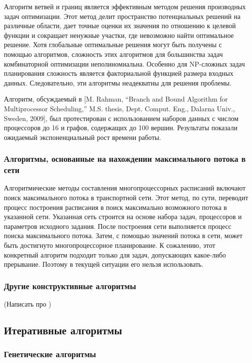 Алгоритм ветвей и границ является эффективным методом решения производных задач оптимизации. Этот метод делит пространство потенциальных решений на различные области, дает точные оценки их значения по отношению к целевой функции и сокращает ненужные участки, где невозможно найти оптимальное решение. Хотя глобальные оптимальные решения могут быть получены с помощью алгоритмов, сложность этих алгоритмов для большинства задач комбинаторной оптимизации неполиномиальна. Особенно для NP-сложных задач планирования сложность является факториальной функцией размера входных данных. Следовательно, эти алгоритмы неадекватны для решения проблемы.

Алгоритм, обсуждаемый в [M. Rahman, “Branch and Bound Algorithm for Multiprocessor Scheduling,” M.S. thesis, Dept. Comput. Eng., Dalarna Univ., Sweden, 2009], был протестирован с использованием наборов данных с числом процессоров до 16 и графов, содержащих до 100 вершин. Результаты показали ожидаемый экспоненциальный рост времени работы.

\subsubsection{Алгоритмы, основанные на нахождении максимального потока в сети}

Алгоритмические методы составления многопроцессорных расписаний включают поиск максимального потока в транспортной сети. Этот метод, по сути, переводит процесс построения расписания в поиск максимально возможного потока в указанной сети. Указанная сеть строится на основе набора задач, процессоров и параметров исходного задания. После построения сети выполняется процесс поиска максимального потока. Затем, с помощью значений потока в сети, может быть достигнуто многопроцессорное планирование. К сожалению, этот конкретный алгоритм подходит только для задач, допускающих какое-либо прерывание. Поэтому в текущей ситуации его нельзя использовать.

\subsubsection{Другие конструктивные алгоритмы}
(Написать про \cite{heterog_review})

\subsection{Итеративные алгоритмы}

\subsubsection{Генетические алгоритмы}

